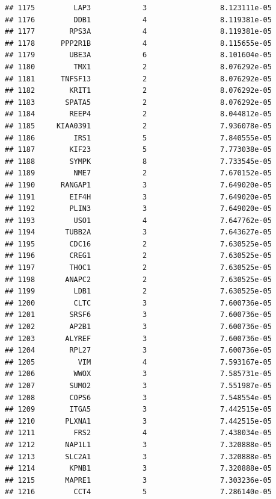 \documentclass[
]{article}
\begin{document}
\begin{verbatim}
## 1175         LAP3            3                 8.123111e-05
## 1176         DDB1            4                 8.119381e-05
## 1177        RPS3A            4                 8.119381e-05
## 1178      PPP2R1B            4                 8.115655e-05
## 1179        UBE3A            6                 8.101604e-05
## 1180         TMX1            2                 8.076292e-05
## 1181      TNFSF13            2                 8.076292e-05
## 1182        KRIT1            2                 8.076292e-05
## 1183       SPATA5            2                 8.076292e-05
## 1184        REEP4            2                 8.044812e-05
## 1185     KIAA0391            2                 7.936078e-05
## 1186         IRS1            5                 7.840555e-05
## 1187        KIF23            5                 7.773038e-05
## 1188        SYMPK            8                 7.733545e-05
## 1189         NME7            2                 7.670152e-05
## 1190      RANGAP1            3                 7.649020e-05
## 1191        EIF4H            3                 7.649020e-05
## 1192        PLIN3            3                 7.649020e-05
## 1193         USO1            4                 7.647762e-05
## 1194       TUBB2A            3                 7.643627e-05
## 1195        CDC16            2                 7.630525e-05
## 1196        CREG1            2                 7.630525e-05
## 1197        THOC1            2                 7.630525e-05
## 1198       ANAPC2            2                 7.630525e-05
## 1199         LDB1            2                 7.630525e-05
## 1200         CLTC            3                 7.600736e-05
## 1201        SRSF6            3                 7.600736e-05
## 1202        AP2B1            3                 7.600736e-05
## 1203       ALYREF            3                 7.600736e-05
## 1204        RPL27            3                 7.600736e-05
## 1205          VIM            4                 7.593167e-05
## 1206         WWOX            3                 7.585731e-05
## 1207        SUMO2            3                 7.551987e-05
## 1208        COPS6            3                 7.548554e-05
## 1209        ITGA5            3                 7.442515e-05
## 1210       PLXNA1            3                 7.442515e-05
## 1211         FRS2            4                 7.438034e-05
## 1212       NAP1L1            3                 7.320888e-05
## 1213       SLC2A1            3                 7.320888e-05
## 1214        KPNB1            3                 7.320888e-05
## 1215       MAPRE1            3                 7.303236e-05
## 1216         CCT4            5                 7.286140e-05

\end{verbatim}
\end{document}
